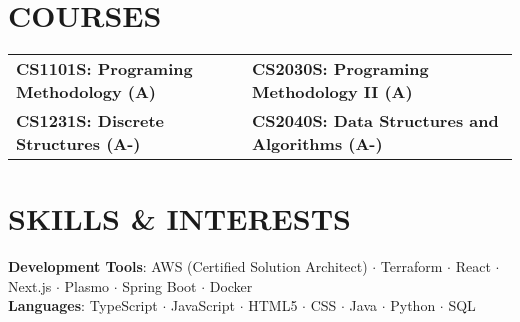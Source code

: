 \documentclass[letterpaper,11pt]{article}
\begin{document}
\section{COURSES}
\begin{tabularx}{\textwidth}{X X}
  \textbf{CS1101S: Programing Methodology (A)} & \textbf{CS2030S: Programing Methodology II (A)} \\
  \textbf{CS1231S: Discrete Structures (A-)} & \textbf{CS2040S: Data Structures and Algorithms (A-)} \\
\end{tabularx}

\section{SKILLS \& INTERESTS}
 \begin{itemize}[leftmargin=0.15in, label={}]
    \small{\item{
    \vspace{1mm}
    \textbf{Development Tools}{: AWS (Certified Solution Architect) {\bfseries\large$\cdot$} Terraform {\bfseries\large$\cdot$} React {\bfseries\large$\cdot$} Next.js {\bfseries\large$\cdot$} Plasmo  {\bfseries\large$\cdot$} Spring Boot {\bfseries\large$\cdot$} Docker } \\
    \vspace{1mm}
    \textbf{Languages}{: TypeScript {\bfseries\large$\cdot$} JavaScript {\bfseries\large$\cdot$} HTML5 {\bfseries\large$\cdot$} CSS {\bfseries\large$\cdot$} Java {\bfseries\large$\cdot$} Python {\bfseries\large$\cdot$} SQL} \\
    \vspace{1mm}

    }}
 \end{itemize}
 \begin{center}
\end{center}
\end{document}
